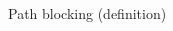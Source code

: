 \documentclass{beamer}
\begin{document}
\begin{frame}{Path blocking (definition)}
\begin{columns}
\begin{column}{0.25\textwidth}

\end{column}
\end{columns}
\end{frame}
\end{document}
